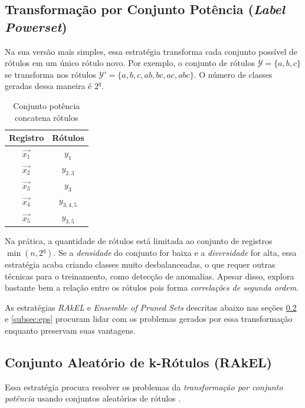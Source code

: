 \documentclass[runningheads,a4paper]{llncs}
\begin{document}
\subsection{Transformação por Conjunto Potência (\textit{Label Powerset})} \label{subsec:conjuntopotencia}

Na sua versão mais simples, essa estratégia transforma cada conjunto possível de rótulos em um único rótulo novo. Por exemplo, o conjunto de rótulos $\mathcal{Y} = \{a, b, c\}$ se transforma nos rótulos $\mathcal{Y'} = \{a, b, c, ab, bc, ac, abc\}$. O número de classes geradas dessa maneira é $2^q$.

\begin{table}
	\centering
	\begin{tabular}{| c | c |}
		\hline
		\textbf{Registro} & \textbf{Rótulos} \\
		\hline
		$\vec{x_1}$ & $y_1$ \\
		\hline
		$\vec{x_2}$ & $y_{2, 3}$ \\
		\hline
		$\vec{x_3}$ & $y_3$ \\
		\hline
		$\vec{x_4}$ & $y_{3, 4, 5}$ \\
		\hline
		$\vec{x_5}$ & $y_{3, 5}$ \\
		\hline
	\end{tabular}
	\caption{Conjunto potência concatena rótulos}
	\label{tab:expotencia}
\end{table}


Na prática, a quantidade de rótulos está limitada ao conjunto de registros $\min(n, 2^q)$. Se a \textit{densidade} do conjunto for baixa e a \textit{diversidade} for alta, essa estratégia acaba criando classes muito desbalanceadas, o que requer outras técnicas para o treinamento, como detecção de anomalias. Apesar disso, explora bastante bem a relação entre os rótulos \cite{Read2008-bt} pois forma \textit{correlações de segunda ordem}.

As estratégias \textit{RAkEL} \cite{Tsoumakas2007-wm} e \textit{Ensemble of Pruned Sets} \cite{Read2008-bt} descritas abaixo nas seções \ref{subsec:rakel} e \ref{subsec:eps} procuram lidar com os problemas gerados por essa transformação enquanto preservam suas vantagens.

\subsection{Conjunto Aleatório de k-Rótulos (RAkEL)} \label{subsec:rakel}

Essa estratégia procura resolver os problemas da \textit{transformação por conjunto potência} usando conjuntos aleatórios de rótulos \cite{Tsoumakas2007-wm}.
\end{document}
